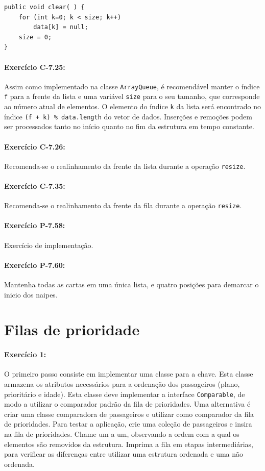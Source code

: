 \begin{lstlisting}[frame=single]
public void clear( ) {
	for (int k=0; k < size; k++)
		data[k] = null;
	size = 0;
}
\end{lstlisting}

\paragraph{Exercício C-7.25:}
Assim como implementado na classe \texttt{ArrayQueue}, é recomendável manter o índice \texttt{f} para a frente da lista e uma variável \texttt{size} para o seu tamanho, que corresponde ao número atual de elementos. O elemento do índice \texttt{k} da lista será encontrado no índice \texttt{(f + k) \% data.length} do vetor de dados. Inserções e remoções podem ser processados tanto no início quanto no fim da estrutura em tempo constante.

\paragraph{Exercício C-7.26:}
Recomenda-se o realinhamento da frente da lista durante a operação \texttt{resize}.

\paragraph{Exercício C-7.35:}
Recomenda-se o realinhamento da frente da fila durante a operação \texttt{resize}.

\paragraph{Exercício P-7.58:}
Exercício de implementação.

\paragraph{Exercício P-7.60:}
Mantenha todas as cartas em uma única lista, e quatro posições para demarcar o inicio dos naipes.

\section{Filas de prioridade}

\paragraph{Exercício 1:}
O primeiro passo consiste em implementar uma classe para a chave. Esta classe armazena os atributos necessários para a ordenação dos passageiros (plano, prioritário e idade). Esta classe deve implementar a interface \texttt{Comparable}, de modo a utilizar o comparador padrão da fila de prioridades. Uma alternativa é criar uma classe comparadora de passageiros e utilizar como comparador da fila de prioridades. Para testar a aplicação, crie uma coleção de passageiros e insira na fila de prioridades. Chame um a um, observando a ordem com a qual os elementos são removidos da estrutura. Imprima a fila em etapas intermediárias, para verificar as diferenças entre utilizar uma estrutura ordenada e uma não ordenada.

